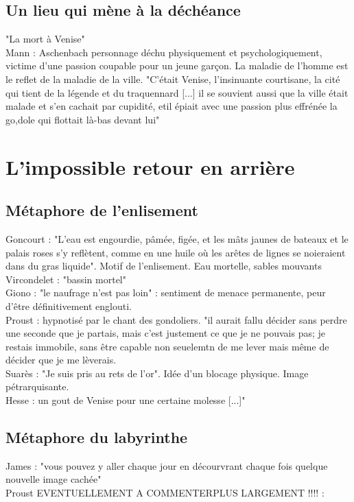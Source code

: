 \documentclass[a4paper,10pt]{article}
\begin{document}
	\subsection{Un lieu qui mène à la déchéance}
		"La mort à Venise"\\
		Mann \cite{Mann1947} : Aschenbach personnage déchu physiquement et psychologiquement, victime d'une passion coupable pour un jeune garçon. La maladie de l'homme est le reflet de la maladie de la ville. "C'était Venise, l'insinuante courtisane, la cité qui tient de la légende et du traquennard [...] il se souvient aussi que la ville était malade et s'en cachait par cupidité, etil épiait avec une passion plus effrénée la go,dole qui flottait là-bas devant lui"\\

\section{L'impossible retour en arrière}
	\subsection{Métaphore de l'enlisement}
		Goncourt \cite{Goncourt1855} : "L'eau est engourdie, pâmée, figée, et les mâts jaunes de bateaux et le palais roses s'y reflètent, comme en une huile où les arêtes de lignes se noieraient dans du gras liquide". Motif de l'enlisement. Eau mortelle, sables mouvants\\
		Vircondelet \cite{Vircondelet1979} : "bassin mortel"\\
		Giono \cite{Giono1954} : "le naufrage n'est pas loin" : sentiment de menace permanente, peur d'être définitivement englouti.\\
		Proust \cite{Proust1927} : hypnotisé par le chant des gondoliers. "il aurait fallu décider sans perdre une seconde que je partais, mais c'est justement ce que je ne pouvais pas; je restais immobile, sans être capable non seuelemtn de me lever mais même de décider que je me lèverais.\\
		Suarès \cite{Suares1910} : "Je suis pris au rets de l'or". Idée d'un blocage physique. Image pétrarquisante.\\
		Hesse \cite{Hesse1901} : un gout de Venise pour une certaine molesse [...]"\\
	\subsection{Métaphore du labyrinthe}
		James \cite{James1909} : "vous pouvez y aller chaque jour en décourvrant chaque fois quelque nouvelle image cachée"\\
		Proust EVENTUELLEMENT A COMMENTERPLUS LARGEMENT !!!! \cite{Proust1927} :
		
\end{document}
